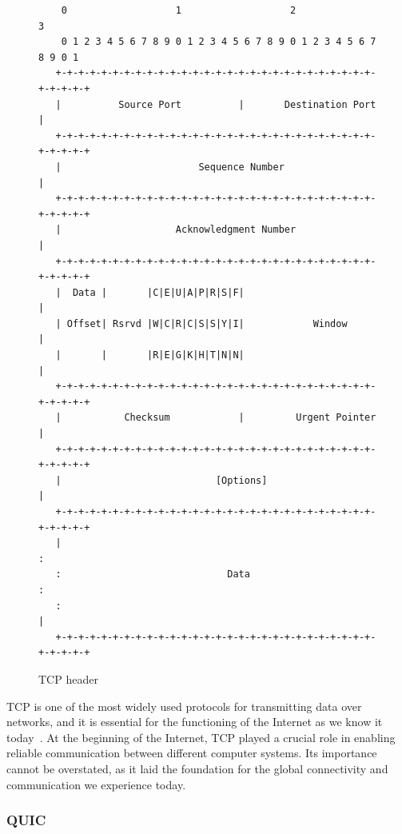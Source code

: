 \documentclass[
  printed,     %
  color,       %
  oneside,     %
  nosansbold,  %
  nocolorbold, %
  nolof,         %
  nolot,         %
]{fithesis4}
\begin{document}
\begin{figure}[h]
\fontsize{10pt}{10pt}\selectfont
\begin{center}
\begin{BVerbatim}
    0                   1                   2                   3
    0 1 2 3 4 5 6 7 8 9 0 1 2 3 4 5 6 7 8 9 0 1 2 3 4 5 6 7 8 9 0 1
   +-+-+-+-+-+-+-+-+-+-+-+-+-+-+-+-+-+-+-+-+-+-+-+-+-+-+-+-+-+-+-+-+
   |          Source Port          |       Destination Port        |
   +-+-+-+-+-+-+-+-+-+-+-+-+-+-+-+-+-+-+-+-+-+-+-+-+-+-+-+-+-+-+-+-+
   |                        Sequence Number                        |
   +-+-+-+-+-+-+-+-+-+-+-+-+-+-+-+-+-+-+-+-+-+-+-+-+-+-+-+-+-+-+-+-+
   |                    Acknowledgment Number                      |
   +-+-+-+-+-+-+-+-+-+-+-+-+-+-+-+-+-+-+-+-+-+-+-+-+-+-+-+-+-+-+-+-+
   |  Data |       |C|E|U|A|P|R|S|F|                               |
   | Offset| Rsrvd |W|C|R|C|S|S|Y|I|            Window             |
   |       |       |R|E|G|K|H|T|N|N|                               |
   +-+-+-+-+-+-+-+-+-+-+-+-+-+-+-+-+-+-+-+-+-+-+-+-+-+-+-+-+-+-+-+-+
   |           Checksum            |         Urgent Pointer        |
   +-+-+-+-+-+-+-+-+-+-+-+-+-+-+-+-+-+-+-+-+-+-+-+-+-+-+-+-+-+-+-+-+
   |                           [Options]                           |
   +-+-+-+-+-+-+-+-+-+-+-+-+-+-+-+-+-+-+-+-+-+-+-+-+-+-+-+-+-+-+-+-+
   |                                                               :
   :                             Data                              :
   :                                                               |
   +-+-+-+-+-+-+-+-+-+-+-+-+-+-+-+-+-+-+-+-+-+-+-+-+-+-+-+-+-+-+-+-+
\end{BVerbatim}
\end{center}
  \caption{TCP header~\cite{RFC0793}}
  \label{fig:tcp}
\end{figure}

TCP is one of the most widely used protocols for transmitting data over networks, and it is essential for the functioning of the Internet as we know it today~\cite{10.5555/2584507}. At the beginning of the Internet, TCP played a crucial role in enabling reliable communication between different computer systems. Its importance cannot be overstated, as it laid the foundation for the global connectivity and communication we experience today.

\subsubsection{QUIC}
\end{document}

